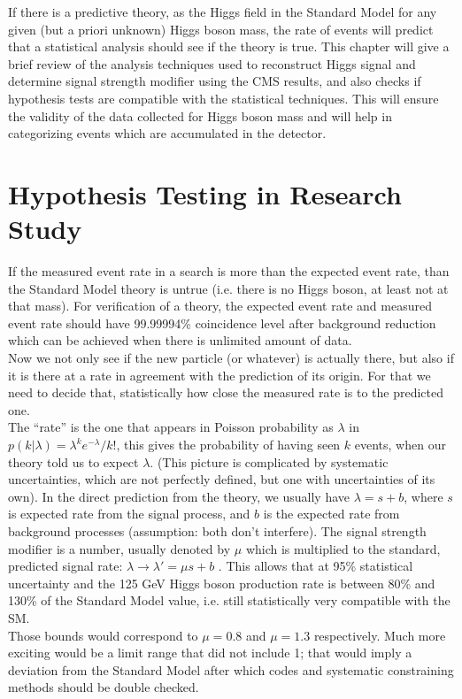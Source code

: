 If there is a predictive theory, as the Higgs field in the Standard Model for any given (but a priori unknown) Higgs boson mass, the rate of events will predict that a statistical analysis should see if the theory is true. This chapter will give a brief review of the analysis techniques used to reconstruct Higgs signal and determine signal strength modifier using the CMS results, and also checks if hypothesis tests are compatible with the statistical techniques.  This will ensure the validity of the data collected for Higgs boson mass and will help in categorizing events which are accumulated in the detector. 
\section{Hypothesis Testing in Research Study}
If the measured event rate in a search is more than the expected event rate, than the Standard Model theory is untrue (i.e. there is no Higgs boson, at least not at that mass). For verification of a theory, the expected event rate and measured event rate should have 99.99994\% coincidence level after background reduction which can be achieved when there is unlimited amount of data.\\
Now we not only see if the new particle (or whatever) is actually there, but also if it is there at a rate in agreement with the prediction of its origin. For that we need to decide that, statistically how close the measured rate is to the predicted one.\\
The “rate” is the one that appears in  Poisson probability as $\lambda$ in $p(k|\lambda)=\lambda^{k} e^{-\lambda}/k!$, this gives the probability of having seen $k$ events, when our theory told us to expect $\lambda$. (This picture is complicated by systematic
uncertainties, which are not perfectly defined, but one with uncertainties of its own). In the direct prediction from the theory, we usually have $\lambda=s+b$, where $s$ is expected rate from the signal process, and $b$ is the expected rate from background processes (assumption: both don’t interfere).
The signal strength modifier is a number, usually denoted by $\mu$ which is multiplied to the standard, predicted signal rate: $\lambda \rightarrow \lambda'=\mu s+b$ . This allows that at 95\% statistical uncertainty and the 125 GeV Higgs boson production rate is between 80\% and 130\% of the Standard Model value, i.e. still statistically
very compatible with the SM.\\
Those bounds would correspond to $\mu=0.8$ and $\mu=1.3$ respectively. Much more exciting would be a limit range that did not include 1; that would imply a deviation from the Standard Model after which codes and systematic constraining methods should be double checked.
